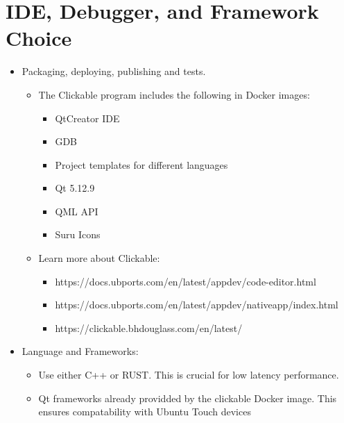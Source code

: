 \section{IDE, Debugger, and Framework Choice}



\begin{itemize}
	\item Packaging, deploying, publishing and tests.
	\begin{itemize}
		\item The Clickable program includes the following in Docker images:
		\begin{itemize}
			\item QtCreator IDE
			\item GDB
			\item Project templates for different languages
			\item Qt 5.12.9
			\item QML API
			\item Suru Icons
		\end{itemize}
		\item Learn more about Clickable:
		\begin{itemize}
			\item https://docs.ubports.com/en/latest/appdev/code-editor.html
			\item https://docs.ubports.com/en/latest/appdev/nativeapp/index.html
			\item https://clickable.bhdouglass.com/en/latest/
		\end{itemize} 
	\end{itemize}	
	\item Language and Frameworks:
	\begin{itemize}
		\item Use either C++ or RUST. This is crucial for low latency performance.
		\item Qt frameworks already providded by the clickable Docker image. This ensures compatability with Ubuntu Touch devices
	\end{itemize}
\end{itemize}
